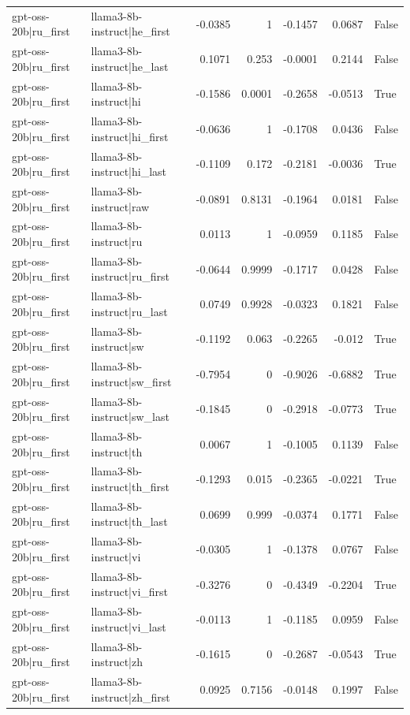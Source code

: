 \begin{table}
\begin{tabular}{l l r r r r l}
gpt-oss-20b|ru_first & llama3-8b-instruct|he_first & -0.0385 & 1 & -0.1457 & 0.0687 & False \\
gpt-oss-20b|ru_first & llama3-8b-instruct|he_last & 0.1071 & 0.253 & -0.0001 & 0.2144 & False \\
gpt-oss-20b|ru_first & llama3-8b-instruct|hi & -0.1586 & 0.0001 & -0.2658 & -0.0513 & True \\
gpt-oss-20b|ru_first & llama3-8b-instruct|hi_first & -0.0636 & 1 & -0.1708 & 0.0436 & False \\
gpt-oss-20b|ru_first & llama3-8b-instruct|hi_last & -0.1109 & 0.172 & -0.2181 & -0.0036 & True \\
gpt-oss-20b|ru_first & llama3-8b-instruct|raw & -0.0891 & 0.8131 & -0.1964 & 0.0181 & False \\
gpt-oss-20b|ru_first & llama3-8b-instruct|ru & 0.0113 & 1 & -0.0959 & 0.1185 & False \\
gpt-oss-20b|ru_first & llama3-8b-instruct|ru_first & -0.0644 & 0.9999 & -0.1717 & 0.0428 & False \\
gpt-oss-20b|ru_first & llama3-8b-instruct|ru_last & 0.0749 & 0.9928 & -0.0323 & 0.1821 & False \\
gpt-oss-20b|ru_first & llama3-8b-instruct|sw & -0.1192 & 0.063 & -0.2265 & -0.012 & True \\
gpt-oss-20b|ru_first & llama3-8b-instruct|sw_first & -0.7954 & 0 & -0.9026 & -0.6882 & True \\
gpt-oss-20b|ru_first & llama3-8b-instruct|sw_last & -0.1845 & 0 & -0.2918 & -0.0773 & True \\
gpt-oss-20b|ru_first & llama3-8b-instruct|th & 0.0067 & 1 & -0.1005 & 0.1139 & False \\
gpt-oss-20b|ru_first & llama3-8b-instruct|th_first & -0.1293 & 0.015 & -0.2365 & -0.0221 & True \\
gpt-oss-20b|ru_first & llama3-8b-instruct|th_last & 0.0699 & 0.999 & -0.0374 & 0.1771 & False \\
gpt-oss-20b|ru_first & llama3-8b-instruct|vi & -0.0305 & 1 & -0.1378 & 0.0767 & False \\
gpt-oss-20b|ru_first & llama3-8b-instruct|vi_first & -0.3276 & 0 & -0.4349 & -0.2204 & True \\
gpt-oss-20b|ru_first & llama3-8b-instruct|vi_last & -0.0113 & 1 & -0.1185 & 0.0959 & False \\
gpt-oss-20b|ru_first & llama3-8b-instruct|zh & -0.1615 & 0 & -0.2687 & -0.0543 & True \\
gpt-oss-20b|ru_first & llama3-8b-instruct|zh_first & 0.0925 & 0.7156 & -0.0148 & 0.1997 & False \\

\end{tabular}
\end{table}
